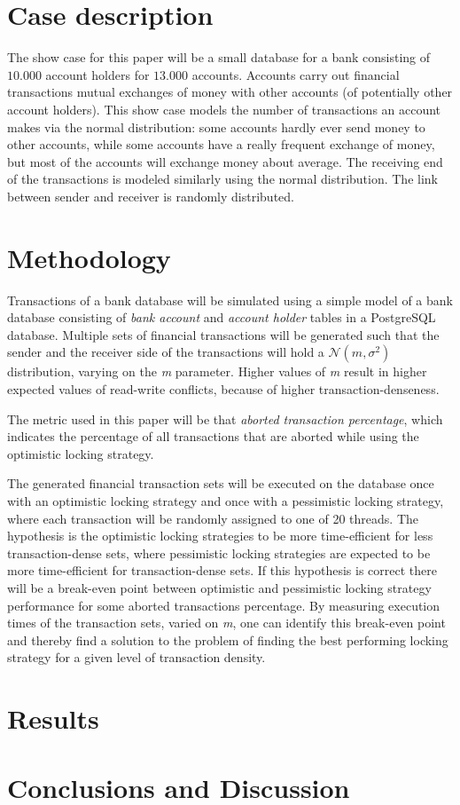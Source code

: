 \documentclass{sig-alternate-br}
\begin{document}
\section{Case description}
\label{sec:case}
The show case for this paper will be a small database for a bank consisting of $10.000$ account holders for $13.000$ accounts. Accounts carry out financial transactions mutual exchanges of money with other accounts (of potentially other account holders). This show case models the number of transactions an account makes via the normal distribution: some accounts hardly ever send money to other accounts, while some accounts have a really frequent exchange of money, but most of the accounts will exchange money about average. The receiving end of the transactions is modeled similarly using the normal distribution. The link between sender and receiver is randomly distributed.

\section{Methodology}
\label{sec:methodology}
Transactions of a bank database will be simulated using a simple model of a bank database consisting of \emph{bank account} and \emph{account holder} tables in a PostgreSQL database. Multiple sets of financial transactions will be generated such that the sender and the receiver side of the transactions will hold a $\mathcal{N} (m,\sigma^2)$ distribution, varying on the \emph{m} parameter. Higher values of \emph{m} result in higher expected values of read-write conflicts, because of higher transaction-denseness. 

The metric used in this paper will be that \emph{aborted transaction percentage}, which indicates the percentage of all transactions that are aborted while using the optimistic locking strategy.

The generated financial transaction sets will be executed on the database once with an optimistic locking strategy and once with a pessimistic locking strategy, where each transaction will be randomly assigned to one of 20 threads. The hypothesis is the optimistic locking strategies to be more time-efficient for less transaction-dense sets, where pessimistic locking strategies are expected to be more time-efficient for transaction-dense sets. If this hypothesis is correct there will be a break-even point between optimistic and pessimistic locking strategy performance for some aborted transactions percentage. By measuring execution times of the transaction sets, varied on \emph{m}, one can identify this break-even point and thereby find a solution to the problem of finding the best performing locking strategy for a given level of transaction density.

\section{Results}
\label{sec:results}

\section{Conclusions and Discussion}
\label{sec:conclusions}


%


\balancecolumns

\onecolumn
\end{document}
